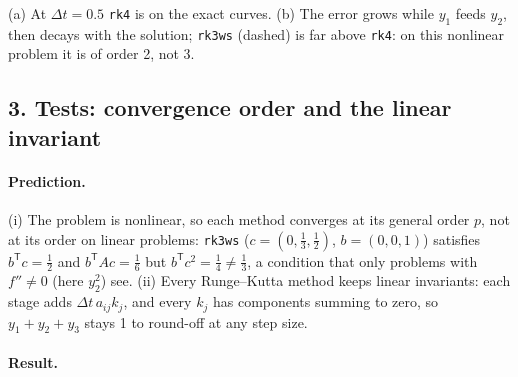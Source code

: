 \documentclass[11pt,a4paper]{article}
\begin{document}
(a) At $\Delta t = 0.5$ \texttt{rk4} is on the exact curves. (b) The error
grows while $y_1$ feeds $y_2$, then decays with the solution;
\texttt{rk3ws} (dashed) is far above \texttt{rk4}: on this nonlinear problem
it is of order 2, not 3.

\newpage
\subsection*{3. Tests: convergence order and the linear invariant}

\paragraph{Prediction.} (i) The problem is nonlinear, so each method
converges at its general order $p$, not at its order on linear problems:
\texttt{rk3ws} ($c = (0, \tfrac13, \tfrac12)$, $b = (0, 0, 1)$) satisfies
$b^{\mathsf T}c = \tfrac12$ and $b^{\mathsf T}Ac = \tfrac16$ but
$b^{\mathsf T}c^2 = \tfrac14 \ne \tfrac13$, a condition that only problems
with $f'' \ne 0$ (here $y_2^2$) see. (ii) Every Runge--Kutta method keeps
linear invariants: each stage adds $\Delta t\,a_{ij}k_j$, and every $k_j$ has
components summing to zero, so $y_1 + y_2 + y_3$ stays 1 to round-off at any
step size.

\paragraph{Result.}
\begin{center}
\small

\end{center}
\end{document}
